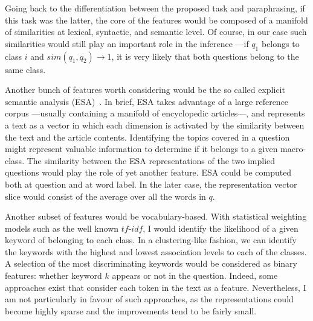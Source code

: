 \documentclass[11pt]{article}
\begin{document}
Going back to the differentiation between the proposed task and paraphrasing, 
if this task was the latter, the core of the features would be composed of a 
manifold of similarities at lexical, syntactic, and semantic level. Of course, 
in our case such similarities would still play an important role in the 
inference ---if $q_1$ belongs to class $i$ and $sim(q_1,q_2)\rightarrow 1$, it 
is very likely that both questions belong to the same class. 

Another bunch of features worth considering would be the so called explicit 
semantic analysis (ESA)~\cite{Gabrilovich:07}. In brief, ESA takes advantage of 
a large reference corpus ---usually containing a manifold of encyclopedic 
articles---, and represents a text as a vector in which each dimension is 
activated by the similarity between the text and the article contents. 
Identifying the topics covered in a question might represent valuable 
information to determine if it belongs to a given macro-class. The similarity 
between the ESA representations of the two implied questions would play the role 
of yet another feature. ESA could be computed both at question and at word 
label. In the later case, the representation vector slice would consist of the 
average over all the words in $q$.

Another subset of features would be vocabulary-based. With statistical weighting 
models such as the well known $tf$-$idf$, I would identify the likelihood of a 
given keyword of belonging to each class. In a clustering-like fashion, we can 
identify the keywords with the highest and lowest association levels to each of 
the classes. A selection of the most discriminating keywords would be considered 
as binary features: whether keyword $k$ appears or not in the question. Indeed, 
some approaches exist that consider each token in the text as a feature. 
Nevertheless, I am not particularly in favour of such approaches, as the 
representations could become highly sparse and the improvements tend to be 
fairly small.



\end{document}

